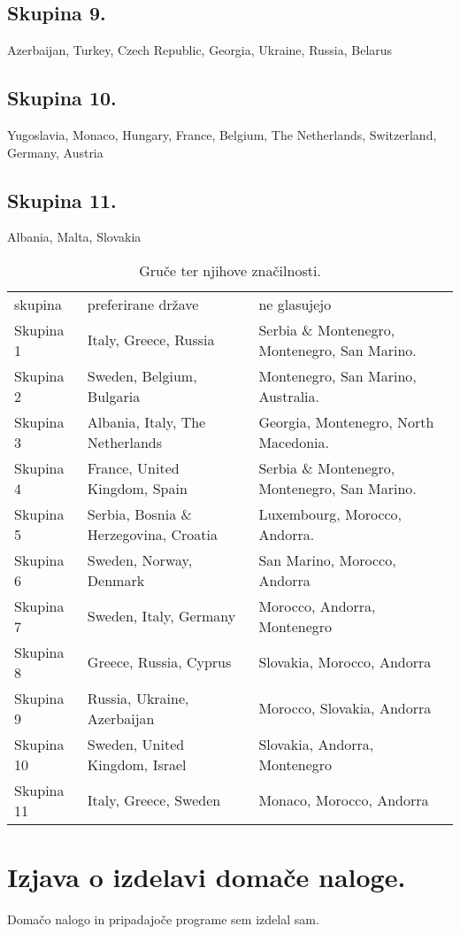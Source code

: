\documentclass[a4paper,11pt]{article}
\begin{document}
\subsection{Skupina 9.}
Azerbaijan, Turkey, Czech Republic, Georgia, Ukraine, Russia, Belarus
\subsection{Skupina 10.}
Yugoslavia, Monaco, Hungary, France, Belgium, The Netherlands, Switzerland, Germany, Austria
\subsection{Skupina 11.}
Albania, Malta, Slovakia
\newpage

\begin{table}[htbp]
    \caption{Gruče ter njihove značilnosti.}
\label{tab1}
\begin{center}
    \begin{tabular}{llp{6cm}}
\hline
skupina & preferirane države & ne glasujejo \\
Skupina 1 & Italy, Greece, Russia & Serbia \& Montenegro, Montenegro, San Marino. \\
Skupina 2 & Sweden, Belgium, Bulgaria & Montenegro, San Marino, Australia. \\
Skupina 3 & Albania, Italy, The Netherlands & Georgia, Montenegro, North Macedonia. \\
Skupina 4 & France, United Kingdom, Spain & Serbia \& Montenegro, Montenegro, San Marino. \\
Skupina 5 & Serbia, Bosnia \& Herzegovina, Croatia & Luxembourg, Morocco, Andorra. \\
Skupina 6 & Sweden, Norway, Denmark & San Marino, Morocco, Andorra \\
Skupina 7 & Sweden, Italy, Germany & Morocco, Andorra, Montenegro \\
Skupina 8 & Greece, Russia, Cyprus & Slovakia, Morocco, Andorra \\
Skupina 9 & Russia, Ukraine, Azerbaijan & Morocco, Slovakia, Andorra \\
Skupina 10 & Sweden, United Kingdom, Israel & Slovakia, Andorra, Montenegro \\
Skupina 11 & Italy, Greece, Sweden & Monaco, Morocco, Andorra \\
\hline
\end{tabular}
\end{center}
\end{table}

\section{Izjava o izdelavi domače naloge.}
Domačo nalogo in pripadajoče programe sem izdelal sam.
\end{document}
